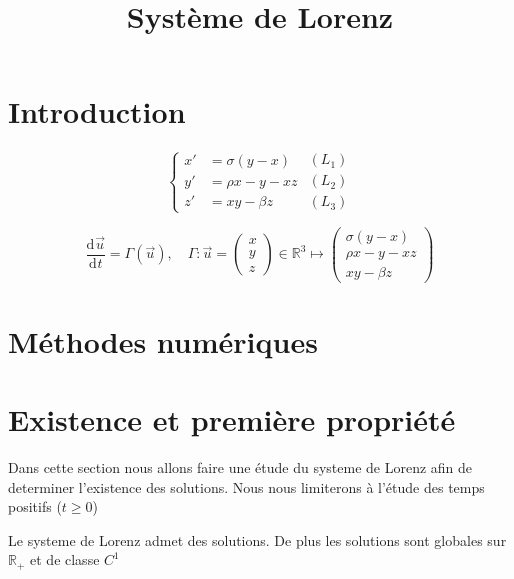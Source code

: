 \documentclass{article}
\title{Système de Lorenz}
\newcommand*\colv[1]{
\left(\begin{array}{c}
    #1
\end{array}\right)
}
\newcommand{\R}{\mathbb{R}}
\newcommand{\deriv}[3][ ]{
    \ensuremath{\frac{\mathrm{d}^{#1}#2}{\mathrm{d}^{#1} #3}}
}
\newtheorem[M , nocut]{prop}{Proposition}[section]
\newtheorem[M]{propt}{Propriété}[section]
\newtheorem[L , nocut]{thm}{Théoreme}
\newtheorem[L]{cor}{Corollaire}
\begin{document}
\begin{titlepage}
    \vfil
\end{titlepage}
\section*{Introduction}

\begin{equation}
    \label{Lorenz}
    \left\{
    \begin{array}{rl}
        x' &=\sigma(y-x) \\
        y' &=\rho x -y - xz\\
        z' &=xy - \beta z
    \end{array}
    \right.
    \begin{array}{r}
        (L_1)\\
        (L_2)\\
        (L_3)
    \end{array}
\end{equation}

\begin{equation}
    \label{fLorenz}
    \deriv{\Vec{u}}{t} = \Gamma(\Vec{u}), \quad
    \Gamma : \Vec{u} = \colv{x\\y\\z} \in \R^3 \mapsto \colv{\sigma(y-x) \\ \rho x-y-xz \\ xy-\beta z}
    \end{equation}

\section{Méthodes numériques}


\section{Existence et première propriété}

Dans cette section nous allons faire une étude du systeme de Lorenz afin de determiner l'existence des solutions. Nous nous limiterons à l'étude des temps positifs ($t \ge 0$)

\begin{prop}
    Le systeme de Lorenz admet des solutions. De plus les solutions sont globales sur $\R_+$ et de classe $C^1$
\end{prop}
\end{document}

